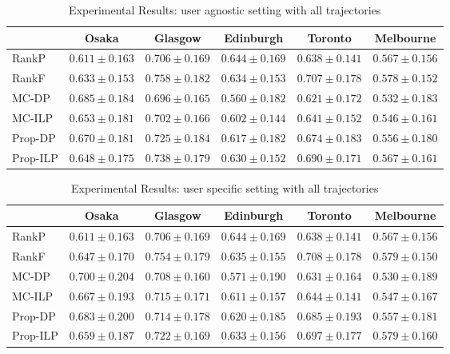 \begin{table*}
\centering
\caption{Experimental Results: user agnostic setting with all trajectories}
\begin{tabular}{l|ccccc} \hline
 & Osaka & Glasgow & Edinburgh & Toronto & Melbourne \\ \hline
RankP & $0.611\pm0.163$ & $0.706\pm0.169$ & $\mathbf{0.644\pm0.169}$ & $0.638\pm0.141$ & $0.567\pm0.156$ \\
RankF & $0.633\pm0.153$ & $\mathbf{0.758\pm0.182}$ & $0.634\pm0.153$ & $\mathbf{0.707\pm0.178}$ & $\mathbf{0.578\pm0.152}$ \\
MC-DP & $\mathbf{0.685\pm0.184}$ & $0.696\pm0.165$ & $0.560\pm0.182$ & $0.621\pm0.172$ & $0.532\pm0.183$ \\
MC-ILP & $0.653\pm0.181$ & $0.702\pm0.166$ & $0.602\pm0.144$ & $0.641\pm0.152$ & $0.546\pm0.161$ \\
Prop-DP & $0.670\pm0.181$ & $0.725\pm0.184$ & $0.617\pm0.182$ & $0.674\pm0.183$ & $0.556\pm0.180$ \\
Prop-ILP & $0.648\pm0.175$ & $0.738\pm0.179$ & $0.630\pm0.152$ & $0.690\pm0.171$ & $0.567\pm0.161$ \\
\hline
\end{tabular}
\end{table*}

\begin{table*}
\centering
\caption{Experimental Results: user specific setting with all trajectories}
\begin{tabular}{l|ccccc} \hline
 & Osaka & Glasgow & Edinburgh & Toronto & Melbourne \\ \hline
RankP & $0.611\pm0.163$ & $0.706\pm0.169$ & $\mathbf{0.644\pm0.169}$ & $0.638\pm0.141$ & $0.567\pm0.156$ \\
RankF & $0.647\pm0.170$ & $\mathbf{0.754\pm0.179}$ & $0.635\pm0.155$ & $\mathbf{0.708\pm0.178}$ & $0.579\pm0.150$ \\
MC-DP & $\mathbf{0.700\pm0.204}$ & $0.708\pm0.160$ & $0.571\pm0.190$ & $0.631\pm0.164$ & $0.530\pm0.189$ \\
MC-ILP & $0.667\pm0.193$ & $0.715\pm0.171$ & $0.611\pm0.157$ & $0.644\pm0.141$ & $0.547\pm0.167$ \\
Prop-DP & $0.683\pm0.200$ & $0.714\pm0.178$ & $0.620\pm0.185$ & $0.685\pm0.193$ & $0.557\pm0.181$ \\
Prop-ILP & $0.659\pm0.187$ & $0.722\pm0.169$ & $0.633\pm0.156$ & $0.697\pm0.177$ & $\mathbf{0.579\pm0.160}$ \\
\hline
\end{tabular}
\end{table*}

